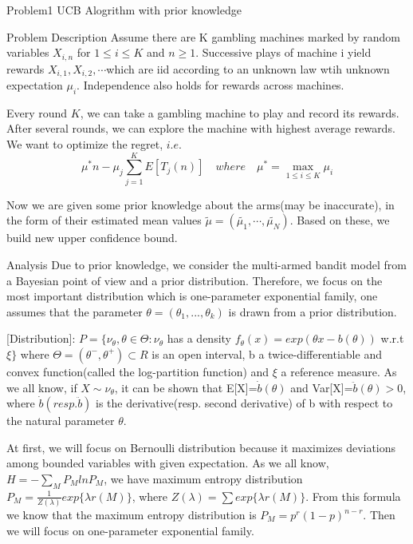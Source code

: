 \documentclass[letterpaper,12pt]{article}
\begin{document}
\begin{section}{Problem1 UCB Alogrithm with prior knowledge}
    \begin{subsection}{Problem Description}
        Assume there are K gambling machines marked by random variables $X_{i,n}$ for $1 \le i \le K$ and $n \ge 1$. Successive plays of machine i yield rewards $X_{i,1},X_{i,2},\cdots$which are iid according to an unknown law wtih unknown expectation $\mu_{i}$. Independence also holds for rewards across machines.\par

        Every round $K$, we can take a gambling machine to play and record its rewards. After several rounds, we can explore the machine with highest average rewards. We want to optimize the regret, $i.e.$ $$\mu^{*}n-\mu_j \sum\limits^{K}_{j=1}E[T_j(n)]\quad where \quad \mu^*= \max_{1 \le i \le K}\mu_i$$

        Now we are given some prior knowledge about the arms(may be inaccurate), in the form of their estimated mean values $\tilde{\mu} = (\tilde{\mu_{1}},\cdots, \tilde{\mu_N})$. Based on these, we build new upper confidence bound.

    \end{subsection}

    \begin{subsection}{Analysis}
        Due to prior knowledge, we consider the multi-armed bandit model from a Bayesian point of view and a prior distribution. Therefore, we focus on the most important distribution which is one-parameter exponential family, one assumes that the parameter $\theta = (\theta_1,...,\theta_k)$ is drawn from a prior distribution.\\ \par

        [Distribution]: 
         $P = \{\nu_\theta,\theta \in \Theta:\nu_\theta$ has a density $f_\theta(x)=exp(\theta x-b(\theta))$ w.r.t $\xi\}$
        where $\Theta = (\theta^-,\theta^+)\subset R$ is an open interval, b a twice-differentiable and convex function(called the log-partition function) and $\xi$ a reference measure. As we all know, if $X\sim \nu_\theta$, it can be shown that E[X]=$\dot b(\theta)$ and Var[X]=$\ddot b(\theta)>0 $, where $\dot b(resp. \ddot b)$ is the derivative(resp. second derivative) of b with respect to the natural parameter $\theta$.\\ \par

        At first, we will focus on Bernoulli distribution because it maximizes deviations among bounded variables with given expectation. As we all know, $H=-\sum\limits_M P_MlnP_M$, we have maximum entropy distribution $P_M = \frac{1}{Z(\lambda)}exp\{\lambda r(M)\} $, where $Z(\lambda) = \sum\limits exp\{\lambda r(M)\}$. From this formula we know that the maximum entropy distribution is $P_M = p^r(1-p)^{n-r} $. Then we will focus on one-parameter exponential family.\\ \par 


\end{subsection}
\end{section}
\end{document}

